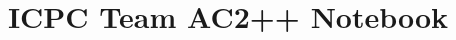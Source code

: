 \documentclass[9pt, a4paper]{article}
\title{\vspace{-4ex}\Large{ICPC Team AC2++ Notebook}}
\author{}
\date{}
\begin{document}
\begin{landscape}
\begin{multicols*}{3}

\maketitle
\vspace{-13ex}
\tableofcontents
\pagestyle{fancy}



\end{multicols*}
\end{landscape}
\end{document}
